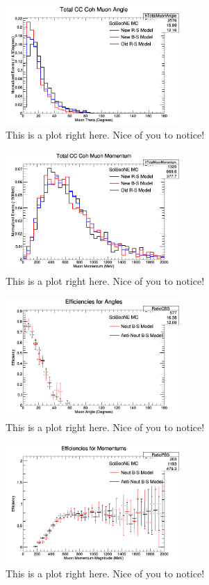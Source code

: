 \documentclass[11pt]{article}
\begin{document}
\begin{figure}[H]
\centering
\includegraphics[width=0.6\textwidth]{NMCombinedPlotsImages/16-NMCombinedPlots.png}
\caption{This is a plot right here. Nice of you to notice!}
\end{figure}

\begin{figure}[H]
\centering
\includegraphics[width=0.6\textwidth]{NMCombinedPlotsImages/17-NMCombinedPlots.png}
\caption{This is a plot right here. Nice of you to notice!}
\end{figure}

\begin{figure}[H]
\centering
\includegraphics[width=0.6\textwidth]{NMCombinedPlotsImages/18-NMCombinedPlots.png}
\caption{This is a plot right here. Nice of you to notice!}
\end{figure}

\begin{figure}[H]
\centering
\includegraphics[width=0.6\textwidth]{NMCombinedPlotsImages/19-NMCombinedPlots.png}
\caption{This is a plot right here. Nice of you to notice!}
\end{figure}
\end{document}
